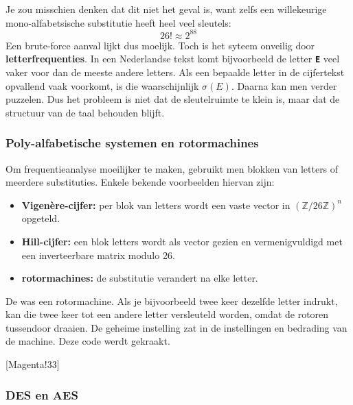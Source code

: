 
Je zou misschien denken dat dit niet het geval is, want zelfs een willekeurige mono-alfabetsische substitutie heeft heel veel sleutels:
\begin{equation*}
    26! \approx 2^{88}
\end{equation*}
Een brute-force aanval lijkt dus moelijk. Toch is het syteem onveilig door \textbf{letterfrequenties}. In een Nederlandse tekst komt bijvoorbeeld de letter \textbf{\texttt{E}} veel vaker voor dan de meeste andere letters. Als een bepaalde letter in de cijfertekst opvallend vaak voorkomt, is die waarschijnlijk $\sigma(E)$. Daarna kan men verder puzzelen. Dus het probleem is niet dat de sleutelruimte te klein is, maar dat de structuur van de taal behouden blijft.

\subsubsection{Poly-alfabetische systemen en rotormachines}

Om frequentieanalyse moeilijker te maken, gebruikt men blokken van letters of meerdere substituties. Enkele bekende voorbeelden hiervan zijn:
\begin{itemize}
    \item \textbf{Vigenère-cijfer:} per blok van letters wordt een vaste vector in $\left(\mathbb{Z}/26\mathbb{Z}\right)^n$ opgeteld.
    \item \textbf{Hill-cijfer:} een blok letters wordt als vector gezien en vermenigvuldigd met een inverteerbare matrix modulo 26.
    \item \textbf{rotormachines:} de substitutie verandert na elke letter.
\end{itemize}


De  was een rotormachine. Als je bijvoorbeeld twee keer dezelfde letter indrukt, kan die twee keer tot een andere letter versleuteld worden, omdat de rotoren tussendoor draaien. De geheime instelling zat in de instellingen en bedrading van de machine. Deze code werdt gekraakt.

\begin{center}
    [Magenta!33]
\end{center}

\subsubsection{DES en AES}

